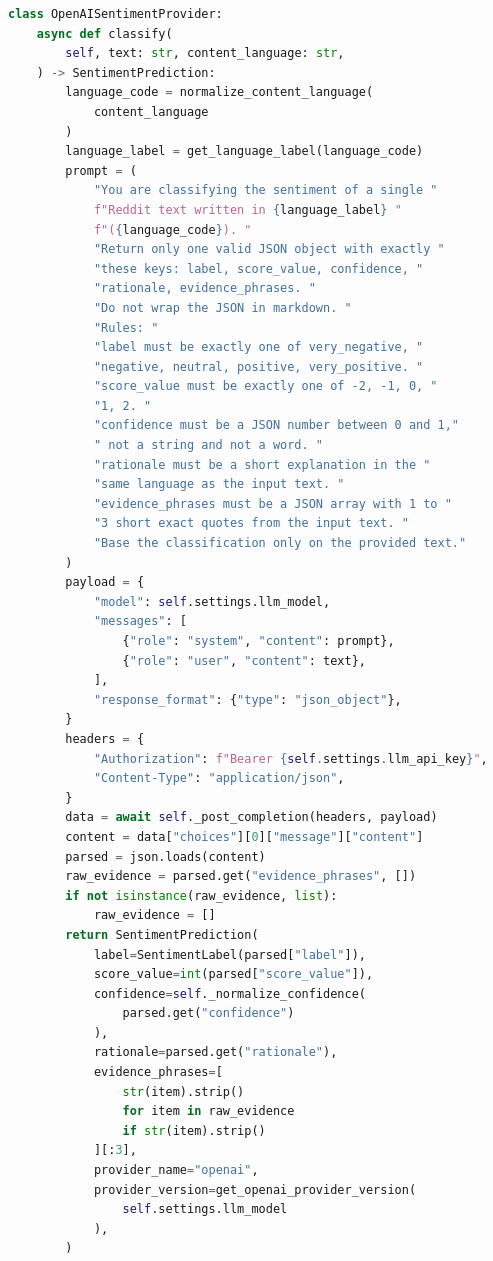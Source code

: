\begin{lstlisting}[language=Python, caption={OpenAI provider --- prompt construction and API call}]
class OpenAISentimentProvider:
    async def classify(
        self, text: str, content_language: str,
    ) -> SentimentPrediction:
        language_code = normalize_content_language(
            content_language
        )
        language_label = get_language_label(language_code)
        prompt = (
            "You are classifying the sentiment of a single "
            f"Reddit text written in {language_label} "
            f"({language_code}). "
            "Return only one valid JSON object with exactly "
            "these keys: label, score_value, confidence, "
            "rationale, evidence_phrases. "
            "Do not wrap the JSON in markdown. "
            "Rules: "
            "label must be exactly one of very_negative, "
            "negative, neutral, positive, very_positive. "
            "score_value must be exactly one of -2, -1, 0, "
            "1, 2. "
            "confidence must be a JSON number between 0 and 1,"
            " not a string and not a word. "
            "rationale must be a short explanation in the "
            "same language as the input text. "
            "evidence_phrases must be a JSON array with 1 to "
            "3 short exact quotes from the input text. "
            "Base the classification only on the provided text."
        )
        payload = {
            "model": self.settings.llm_model,
            "messages": [
                {"role": "system", "content": prompt},
                {"role": "user", "content": text},
            ],
            "response_format": {"type": "json_object"},
        }
        headers = {
            "Authorization": f"Bearer {self.settings.llm_api_key}",
            "Content-Type": "application/json",
        }
        data = await self._post_completion(headers, payload)
        content = data["choices"][0]["message"]["content"]
        parsed = json.loads(content)
        raw_evidence = parsed.get("evidence_phrases", [])
        if not isinstance(raw_evidence, list):
            raw_evidence = []
        return SentimentPrediction(
            label=SentimentLabel(parsed["label"]),
            score_value=int(parsed["score_value"]),
            confidence=self._normalize_confidence(
                parsed.get("confidence")
            ),
            rationale=parsed.get("rationale"),
            evidence_phrases=[
                str(item).strip()
                for item in raw_evidence
                if str(item).strip()
            ][:3],
            provider_name="openai",
            provider_version=get_openai_provider_version(
                self.settings.llm_model
            ),
        )
\end{lstlisting}

